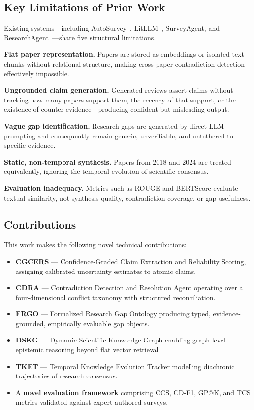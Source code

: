 \documentclass{llncs}
\begin{document}
\subsection{Key Limitations of Prior Work}
\label{sec:limitations}

Existing systems—including AutoSurvey~\cite{wang2024autosurvey},
LitLLM~\cite{agarwal2024litllm}, SurveyAgent, and
ResearchAgent~\cite{baek2024researchagent}—share five structural limitations.

\textbf{Flat paper representation.} Papers are stored as embeddings or isolated
text chunks without relational structure, making cross-paper contradiction
detection effectively impossible.

\textbf{Ungrounded claim generation.} Generated reviews assert claims without
tracking how many papers support them, the recency of that support, or the
existence of counter-evidence—producing confident but misleading output.

\textbf{Vague gap identification.} Research gaps are generated by direct LLM
prompting and consequently remain generic, unverifiable, and untethered to
specific evidence.

\textbf{Static, non-temporal synthesis.} Papers from 2018 and 2024 are treated
equivalently, ignoring the temporal evolution of scientific consensus.

\textbf{Evaluation inadequacy.} Metrics such as ROUGE and BERTScore evaluate
textual similarity, not synthesis quality, contradiction coverage, or gap
usefulness.

\subsection{Contributions}

This work makes the following novel technical contributions:

\begin{itemize}[leftmargin=1.5em,itemsep=0pt]
  \item \textbf{CGCERS} — Confidence-Graded Claim Extraction and Reliability
    Scoring, assigning calibrated uncertainty estimates to atomic claims.
  \item \textbf{CDRA} — Contradiction Detection and Resolution Agent operating
    over a four-dimensional conflict taxonomy with structured reconciliation.
  \item \textbf{FRGO} — Formalized Research Gap Ontology producing typed,
    evidence-grounded, empirically evaluable gap objects.
  \item \textbf{DSKG} — Dynamic Scientific Knowledge Graph enabling
    graph-level epistemic reasoning beyond flat vector retrieval.
  \item \textbf{TKET} — Temporal Knowledge Evolution Tracker modelling
    diachronic trajectories of research consensus.
  \item A \textbf{novel evaluation framework} comprising CCS, CD-F1, GP@K,
    and TCS metrics validated against expert-authored surveys.
\end{itemize}
\end{document}
